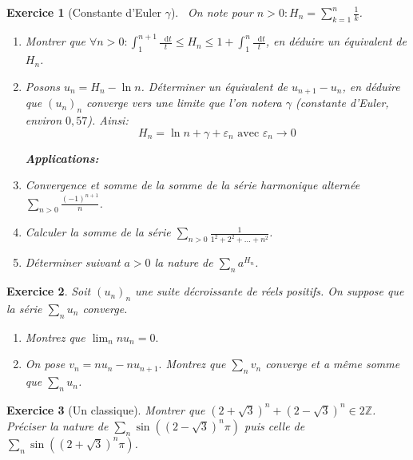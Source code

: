 \documentclass[12pt,a4paper]{article}
\newcommand{\Z}{\mathbb{Z}}
\newcommand{\diff}{\mathop{}\mathopen{}\mathrm{d}}
\theoremstyle{break}
\newtheorem{Exo}{Exercice}
\begin{document}
\begin{Exo}[Constante d'Euler $\gamma$]
\ 
On note pour $n>0:H_n=\sum_{k=1}^{n}\frac{1}{k}$.
\begin{enumerate}
	\item
	Montrer que $\forall n>0:\int_1^{n+1}\frac{\diff t}{t} \leqslant H_n\leqslant 1+\int_1^n \frac{\diff t}{t}$, en déduire un équivalent de $H_n$.
	\item
	Posons $u_n=H_n-\ln n$. Déterminer un équivalent de $u_{n+1}-u_n$, en déduire que $(u_n)_n$ converge vers une limite que l'on notera $\gamma$ (constante d'Euler, environ $0,57$). Ainsi:
	\[H_n=\ln n +\gamma+\varepsilon_n\text{ avec }\varepsilon_n\to 0\]
	
	\textbf{Applications:}
		\item
	Convergence et somme de la somme de la série harmonique alternée $\sum_{n>0}\frac{(-1)^{n+1}}{n}$.
	\item
	Calculer la somme de la série $\sum_{n>0}\frac{1}{1^2+2^2+...+n^2}$.
	\item
	Déterminer suivant $a>0$ la nature de $\sum_n a^{H_n}$.
\end{enumerate}
\end{Exo}



\begin{Exo}
	Soit $(u_{n})_{n}$ une suite décroissante de réels positifs.
On suppose que la série $\sum_n u_{n}$ converge.

\begin{enumerate}
	\item Montrez que $\lim_{n}nu_{n}=0.$
	
	\item On pose $v_{n}=nu_{n}-nu_{n+1}.$ Montrez que $\sum_n v_{n}$ converge et a même somme que $\sum_n u_{n}$.
\end{enumerate}
\end{Exo}


\begin{Exo}[Un classique]
Montrer que $(2+\sqrt{3})^n+(2-\sqrt{3})^n \in 2\Z$. Préciser la nature de $\sum_n \sin\left ( (2-\sqrt{3})^n \pi \right)$ puis celle de $\sum_n \sin\left ( (2+\sqrt{3})^n \pi \right)$.
\end{Exo}
\end{document}
